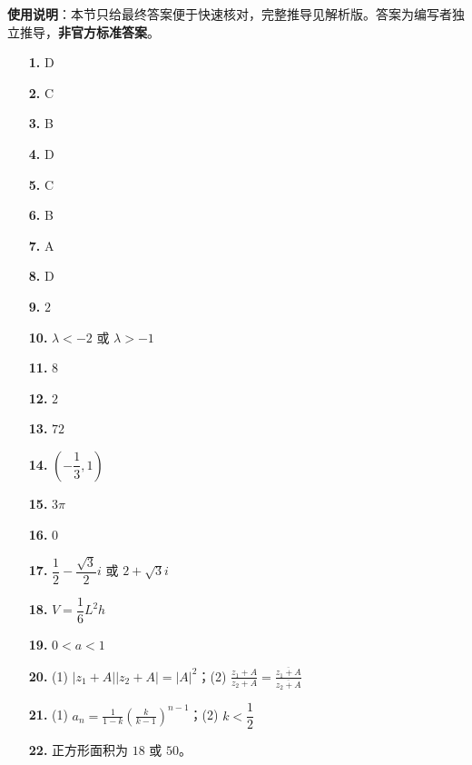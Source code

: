 
\begin{gknotice}
\textbf{使用说明}：本节只给最终答案便于快速核对，完整推导见解析版。答案为编写者独立推导，\textbf{非官方标准答案}。
\end{gknotice}

\begin{itemize}[leftmargin=2.6em]
  \item[\textbf{1.}] D
  \item[\textbf{2.}] C
  \item[\textbf{3.}] B
  \item[\textbf{4.}] D
  \item[\textbf{5.}] C
  \item[\textbf{6.}] B
  \item[\textbf{7.}] A
  \item[\textbf{8.}] D
  \item[\textbf{9.}] $2$
  \item[\textbf{10.}] $\lambda<-2$ 或 $\lambda>-1$
  \item[\textbf{11.}] $8$
  \item[\textbf{12.}] $2$
  \item[\textbf{13.}] $72$
  \item[\textbf{14.}] $\left(-\dfrac13,1\right)$
  \item[\textbf{15.}] $3\pi$
  \item[\textbf{16.}] $0$
  \item[\textbf{17.}] $\dfrac12-\dfrac{\sqrt3}{2}i$ 或 $2+\sqrt3i$
  \item[\textbf{18.}] $V=\dfrac16L^2h$
  \item[\textbf{19.}] $0<a<1$
  \item[\textbf{20.}] (1) $|z_1+A||z_2+A|=|A|^2$；(2) $\displaystyle\frac{z_1+A}{z_2+A}=\frac{\overline{z_1+A}}{\overline{z_2+A}}$
  \item[\textbf{21.}] (1) $\displaystyle a_n=\frac1{1-k}\left(\frac{k}{k-1}\right)^{n-1}$；(2) $k<\dfrac12$
  \item[\textbf{22.}] 正方形面积为 $18$ 或 $50$。
\end{itemize}

